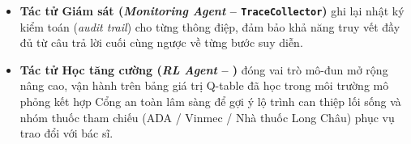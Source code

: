 \begin{itemize}
  \item \textbf{Tác tử Giám sát (\emph{Monitoring Agent} -- \texttt{TraceCollector})} ghi lại nhật ký kiểm toán (\emph{audit trail}) cho từng thông điệp, đảm bảo khả năng truy vết đầy đủ từ câu trả lời cuối cùng ngược về từng bước suy diễn.
  \item \textbf{Tác tử Học tăng cường (\emph{RL Agent} -- )} đóng vai trò mô-đun mở rộng nâng cao, vận hành trên bảng giá trị Q-table đã học trong môi trường mô phỏng kết hợp Cổng an toàn lâm sàng để gợi ý lộ trình can thiệp lối sống và nhóm thuốc tham chiếu (ADA / Vinmec / Nhà thuốc Long Châu) phục vụ trao đổi với bác sĩ.
\end{itemize}

